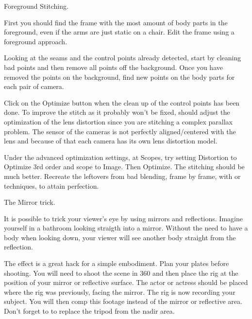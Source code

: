 \begin{fullwidth}

\clearpage
{\large Foreground Stitching. \par}

First you should find the frame with the most amount of body parts in the foreground, even if the arms are just static on a chair. Edit the frame using a foreground approach.

Looking at the seams and the control points already detected, start by cleaning bad points and then remove all points off the background. Once you have removed the points on the background, find new points on the body parts for each pair of camera.

Click on the Optimize button when the clean up of the control points has been done. To improve the stitch as it probably won’t be fixed, should adjust the optimization of the lens distortion since you are stitching a complex parallax problem. The sensor of the cameras is not perfectly aligned/centered with the lens and because of that each camera has its own lens distortion model. 

Under the advanced optimization settings, at Scopes, try setting Distortion to Optimize 3rd order and scope to Image. Then Optimize. The stitching should be much better. Recreate the leftovers from bad blending, frame by frame, with \textbf{} or \textbf{} techniques, to attain perfection.

{\large The Mirror trick. \par}

It is possible to trick your viewer's eye by using mirrors and reflections. Imagine yourself in a bathroom looking straigth into a mirror. Without the need to have a body when looking down, your viewer will see another body straight from the reflection. 

The effect is a great hack for a simple embodiment. Plan your plates before shooting. You will need to shoot the scene in 360 and then place the rig at the position of your mirror or reflective surface. The actor or actress should be placed where the rig was previously, facing the mirror. The rig is now recording your subject. You will then comp this footage instead of the mirror or reflective area. Don't forget to \textbf{} to replace the tripod from the nadir area.


\clearpage
\end{fullwidth}